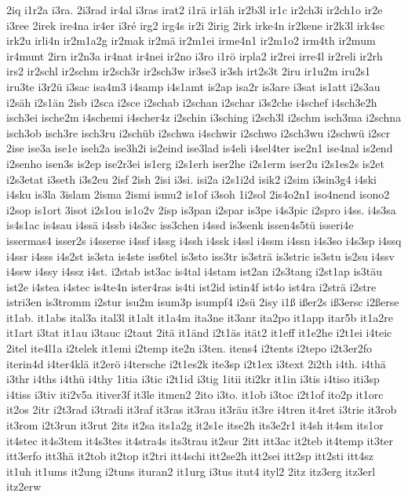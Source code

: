{2iq
i1r2a
i3ra.
2i3rad
ir4al
i3ras
irat2
i1rä
ir1äh
ir2b3l
ir1c
ir2ch3i
ir2ch1o
ir2e
i3ree
2irek
ire4na
ir4er
i3ré
irg2
irg4s
ir2i
2irig
2irk
irke4n
ir2kene
ir2k3l
irk4sc
irk2u
irli4n
ir2m1a2g
ir2mak
ir2mä
ir2m1ei
irme4n1
ir2m1o2
irm4th
ir2mum
ir4munt
2irn
ir2n3a
ir4nat
ir4nei
ir2no
i3ro
i1rö
irpla2
ir2rei
irre4l
ir2reli
ir2rh
irs2
ir2schl
ir2schm
ir2sch3r
ir2sch3w
ir3se3
ir3sh
irt2s3t
2iru
ir1u2m
iru2s1
iru3te
i3r2ü
i3sac
isa4m3
i4samp
i4s1amt
is2ap
isa2r
is3are
i3sat
is1att
i2s3au
i2säh
i2s1än
2isb
i2sca
i2sce
i2schab
i2schan
i2schar
i3s2che
i4schef
i4sch3e2h
isch3ei
ische2m
i4schemi
i4scher4z
i2schin
i3sching
i2sch3l
i2schm
isch3ma
i2schna
isch3ob
isch3re
isch3ru
i2schüb
i2schwa
i4schwir
i2schwo
i2sch3wu
i2schwü
i2scr
2ise
ise3a
ise1e
iseh2a
ise3h2i
is2eind
ise3lad
is4eli
i4sel4ter
ise2n1
ise4nal
is2end
i2senho
isen3s
is2ep
ise2r3ei
is1erg
i2s1erh
iser2he
i2s1erm
iser2u
i2s1es2s
is2et
i2s3etat
i3seth
i3s2eu
2isf
2ish
2isi
i3si.
isi2a
i2s1i2d
isik2
i2sim
i3sin3g4
i4ski
i4sku
is3la
3islam
2isma
2ismi
ismu2
is1of
i3soh
1i2sol
2is4o2n1
iso4nend
isono2
i2sop
is1ort
3isot
i2s1ou
is1o2v
2isp
is3pan
i2spar
is3pe
i4s3pic
i2spro
i4ss.
i4s3sa
is4s1ac
is4sau
i4ssä
i4ssb
i4s3sc
iss3chen
i4ssd
is3senk
issen4s5tü
isseri4e
issermas4
isser2s
i4sserse
i4ssf
i4ssg
i4ssh
i4ssk
i4ssl
i4ssm
i4ssn
i4s3so
i4s3sp
i4ssq
i4ssr
i4sss
i4s2st
is3sta
is4ste
iss6tel
is3sto
iss3tr
is3strä
is3stric
is3stu
is2su
i4ssv
i4ssw
i4ssy
i4ssz
i4st.
i2stab
ist3ac
is4tal
i4stam
ist2an
i2s3tang
i2st1ap
is3täu
ist2e
i4stea
i4stec
is4te4n
ister4ras
is4ti
ist2id
istin4f
ist4o
ist4ra
i2strä
i2stre
istri3en
is3tromm
i2stur
isu2m
isum3p
isumpf4
i2sü
2isy
i1ß
ißer2s
iß3ersc
i2ßerse
it1ab.
it1abs
ital3a
ital3l
it1alt
it1a4m
ita3ne
it3anr
ita2po
it1app
itar5b
it1a2re
it1art
i3tat
it1au
i3tauc
i2taut
2itä
it1änd
i2t1äs
ität2
it1eff
it1e2he
i2t1ei
i4teic
2itel
ite4l1a
i2telek
it1emi
i2temp
ite2n
i3ten.
itens4
i2tents
i2tepo
i2t3er2fo
iterin4d
i4ter4klä
it2erö
i4tersche
i2t1es2k
ite3sp
i2t1ex
i3text
2i2th
i4th.
i4thä
i3thr
i4ths
i4thü
i4thy
1itia
i3tic
i2t1id
i3tig
1itii
iti2kr
it1in
i3tis
i4tiso
iti3sp
i4tiss
i3tiv
iti2v5a
itiver3f
it3le
itmen2
2ito
i3to.
it1ob
i3toc
i2t1of
ito2p
it1orc
it2os
2itr
i2t3rad
i3tradi
it3raf
it3ras
it3rau
it3räu
it3re
i4tren
it4ret
i3trie
it3rob
it3rom
i2t3run
it3rut
2its
it2sa
its1a2g
it2s1e
itse2h
its3e2r1
it4sh
it4sm
its1or
it4stec
it4s3tem
it4s3tes
it4stra4s
its3trau
it2sur
2itt
itt3ac
it2teb
it4temp
it3ter
itt3erfo
itt3hä
it2tob
it2top
it2tri
itt4schi
itt2se2h
itt2sei
itt2sp
itt2sti
itt4sz
it1uh
it1ums
it2ung
i2tuns
ituran2
it1urg
i3tus
itut4
ityl2
2itz
itz3erg
itz3erl
itz2erw
}

